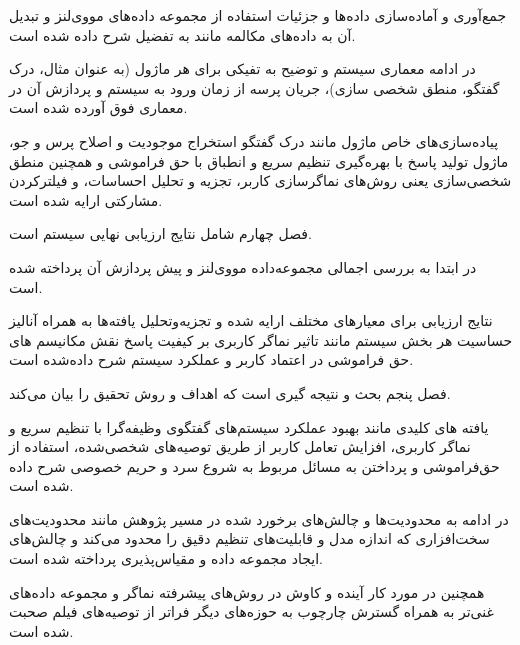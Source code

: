 جمع‌آوری و آماده‌سازی داده‌ها و جزئیات استفاده از مجموعه داده‌های مووی‌لنز  و تبدیل آن به داده‌های مکالمه مانند به تفضیل شرح داده شده است.

در ادامه معماری سیستم و توضیح به تفیکی برای هر ماژول (به عنوان مثال، درک گفتگو، منطق شخصی سازی)، جریان پرسه از زمان ورود به سیستم و  پردازش آن در معماری فوق آورده شده است.

پیاده‌سازی‌های خاص ماژول مانند درک گفتگو استخراج موجودیت و اصلاح پرس و جو، ماژول تولید پاسخ با بهره‌گیری تنظیم سریع و انطباق با حق فراموشی و همچنین منطق شخصی‌سازی یعنی روش‌های نماگر‌سازی کاربر، تجزیه و تحلیل احساسات، و فیلتر‌کردن مشارکتی ارایه شده است.


فصل چهارم شامل نتایج ارزیابی نهایی سیستم است.

در ابتدا به بررسی اجمالی مجموعه‌داده مووی‌لنز و پیش پردازش آن پرداخته شده است.

نتایج ارزیابی برای معیارهای مختلف ارایه شده و  تجزیه‌و‌تحلیل یافته‌ها به همراه آنالیز حساسیت هر بخش سیستم مانند تاثیر نماگر کاربری بر کیفیت پاسخ  نقش مکانیسم های حق فراموشی در اعتماد کاربر و عملکرد سیستم شرح داده‌شده است.


فصل پنجم بحث و نتیجه گیری است که اهداف و روش تحقیق را بیان می‌کند.

یافته های کلیدی مانند بهبود عملکرد  سیستم‌های گفتگوی وظیفه‌گرا با تنظیم سریع و نماگر کاربری، افزایش تعامل کاربر از طریق توصیه‌های شخصی‌شده، استفاده از حق‌فراموشی و پرداختن به مسائل مربوط به شروع سرد و حریم خصوصی شرح داده شده است.

در ادامه به محدودیت‌ها و چالش‌های برخورد شده در مسیر پژوهش مانند محدودیت‌های سخت‌افزاری که اندازه مدل و قابلیت‌های تنظیم دقیق را محدود می‌کند و چالش‌های ایجاد مجموعه داده و مقیاس‌پذیری پرداخته شده است.

همچنین در مورد کار آینده و کاوش در روش‌های پیشرفته نماگر و مجموعه داده‌های غنی‌تر به همراه گسترش چارچوب به حوزه‌های دیگر فراتر از توصیه‌های فیلم صحبت شده است.

